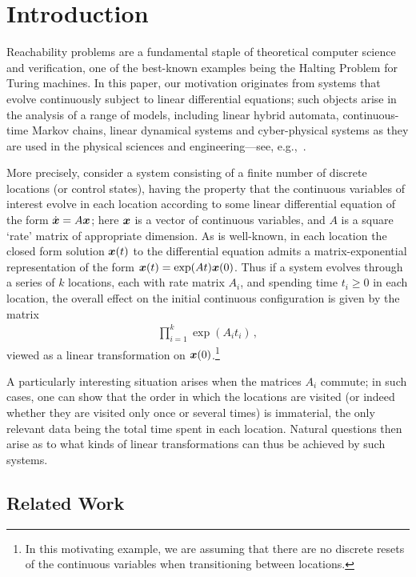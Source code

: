 \section{Introduction}

Reachability problems are a fundamental staple of theoretical computer
science and verification, one of the best-known examples being the
Halting Problem for Turing machines. In this paper, our motivation
originates from systems that evolve continuously subject to linear
differential equations; such objects arise in the analysis of a range
of models, including linear hybrid automata, continuous-time Markov
chains, linear dynamical systems and cyber-physical systems as they
are used in the physical sciences and engineering---see,
e.g.,~\cite{Alu15}.

More precisely, consider a system consisting of a finite number of
discrete locations (or control states), having the property that the
continuous variables of interest evolve in each location according to
some linear differential equation of the form $\dot{\boldsymbol{x}} = A
\boldsymbol{x}$; here $\boldsymbol{x}$ is a vector of continuous
variables, and $A$ is a square `rate' matrix of appropriate
dimension. As is well-known, in each location the closed form solution
$\boldsymbol{x}(t)$ to the differential equation admits a
matrix-exponential representation of the form $\boldsymbol{x}(t) =
\exp(At)\boldsymbol{x}(0)$. Thus if a system evolves through a series
of $k$ locations, each with rate matrix $A_i$, and spending time $t_i
\geq 0$ in each location, the overall effect on the initial continuous
configuration is given by the matrix
\begin{align*}
\prod \limits_{i=1}^{k} \exp(A_{i} t_{i}) \, ,
\end{align*}
viewed as a linear transformation on $\boldsymbol{x}(0)$.\footnote{In
  this motivating example, we are assuming that there are no discrete
  resets of the continuous variables when transitioning between
  locations.}

A particularly interesting situation arises when the matrices $A_i$
commute; in such cases, one can show that the order in which the
locations are visited (or indeed whether they are visited only once or
several times) is immaterial, the only relevant data being the total
time spent in each location. Natural questions then arise as to what
kinds of linear transformations can thus be achieved by such systems.

\subsection{Related Work}

